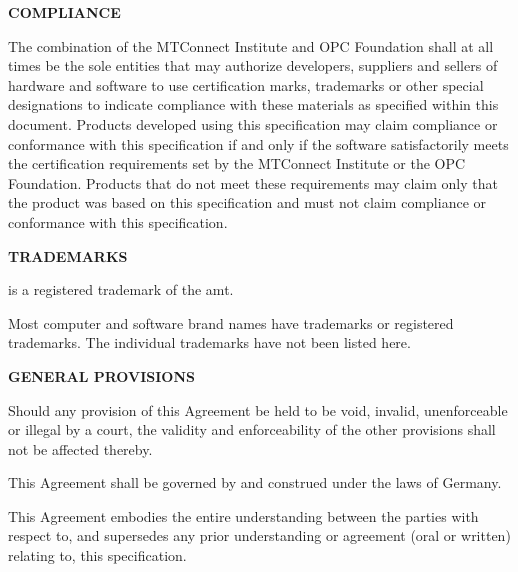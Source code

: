 \textbf{COMPLIANCE}

The combination of the MTConnect Institute and OPC Foundation shall at all times be the sole entities that may authorize developers, suppliers and sellers of hardware and software to use certification marks, trademarks or other special designations to indicate compliance with these materials as specified within this document. Products developed using this specification may claim compliance or conformance with this specification if and only if the software satisfactorily meets the certification requirements set by the MTConnect Institute or the OPC Foundation. Products that do not meet these requirements may claim only that the product was based on this specification and must not claim compliance or conformance with this specification. 

\textbf{TRADEMARKS}

\mtconnect is a registered trademark of the \gls{amt}.

Most computer and software brand names have trademarks or registered trademarks. The individual trademarks have not been listed here.

\textbf{GENERAL PROVISIONS}

Should any provision of this Agreement be held to be void, invalid, unenforceable or illegal by a court, the validity and enforceability of the other provisions shall not be affected thereby. 

This Agreement shall be governed by and construed under the laws of Germany.

This Agreement embodies the entire understanding between the parties with respect to, and supersedes any prior understanding or agreement (oral or written) relating to, this specification.


\clearpage


